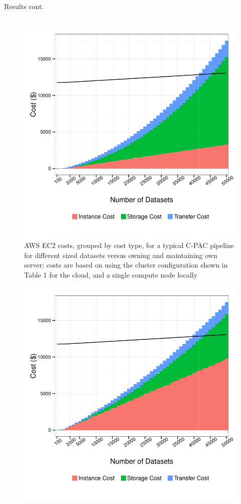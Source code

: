\documentclass[final,hyperref={pdfpagelabels=false}]{beamer}
\begin{document}
\begin{frame}
\begin{columns}
\begin{column}{.5\textwidth}
{\begin{block}{Results cont.}
\begin{column}{.47\textwidth}
                \begin{figure}
                    \includegraphics[width=.99\textwidth]{cpac-costs.pdf}
                    \caption{\label{fig:cpac-costs}AWS EC2 costs, grouped by cost type, for a typical C-PAC pipeline for different sized datasets versus owning and maintaining own server; costs are based on using the cluster configuration shown in Table 1 for the cloud, and a single compute node locally}
                \end{figure}
                \begin{figure}
                    \includegraphics[width=.99\textwidth]{fs-costs.pdf}

\end{figure}
\end{column}
\end{block}}
\end{column}
\end{columns}
\end{frame}
\end{document}
